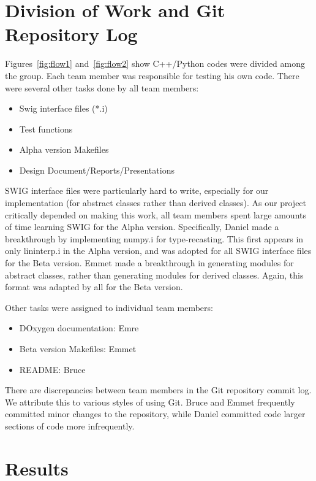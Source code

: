\documentclass[11pt]{article}
\begin{document}

\section{Division of Work and Git Repository Log}
Figures~\ref{fig:flow1} and~\ref{fig:flow2} show C++/Python codes were
divided among the group. Each team member was responsible for testing
his own code. There were several other tasks done by all team members:
\begin{itemize}
\item Swig interface files (*.i)
\item Test functions
\item Alpha version Makefiles
\item Design Document/Reports/Presentations
\end{itemize}
SWIG interface files were particularly hard to write, especially for
our implementation (for abstract classes rather than derived
classes). As our project critically depended on making this work, all
team members spent large amounts of time learning SWIG for the Alpha
version. Specifically, Daniel made a breakthrough by implementing
numpy.i for type-recasting. This first appears in only lininterp.i in
the Alpha version, and was adopted for all SWIG interface files for
the Beta version. Emmet made a breakthrough in generating modules for
abstract classes, rather than generating modules for derived
classes. Again, this format was adapted by all for the Beta version.

Other tasks were assigned to individual team members:
\begin{itemize}
\item DOxygen documentation: Emre
\item Beta version Makefiles: Emmet
\item README: Bruce
\end{itemize}

There are discrepancies between team members in the Git repository
commit log. We attribute this to various styles of using Git. Bruce
and Emmet frequently committed minor changes to the repository, while
Daniel committed code larger sections of code more infrequently.

\section{Results}
\end{document}
